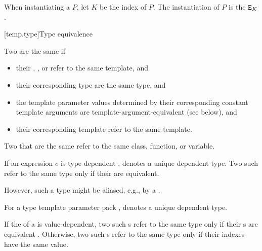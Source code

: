 \documentclass{wg21}
\begin{document}
\begin{addedblock}
When instantiating a  $P$,
let $K$ be the index of $P$.
The instantiation of $P$ is the  $\texttt{E}_K$.
\end{addedblock}


\ednote{[...]}

[temp.type]{Type equivalence}

\pnum
{}%
Two  are the same if
\begin{itemize}
\item
their ,
, or
refer to the same template, and

\item
their corresponding type 
are the same type, and

\item
the template parameter values determined by
their corresponding constant template arguments
are template-argument-equivalent (see below), and

\item
their corresponding template 
refer to the same template.
\end{itemize}
Two  that are the same
refer to the same class, function, or variable.

\ednote{[...]}

\pnum
If an expression $e$ is type-dependent ,
denotes a unique dependent type. Two such 
refer to the same type only if their  are
equivalent.
\begin{note}
    However, such a type might be aliased,
    e.g., by a .
\end{note}

\pnum
For a type template parameter pack ,
\tcode{T...[}\tcode{]} denotes
a unique dependent type.

\pnum
If the  of a 
is value-dependent,
two such s refer to the same type
only if their s are equivalent .
Otherwise, two such s refer to the same type
only if their indexes have the same value.
\end{document}
